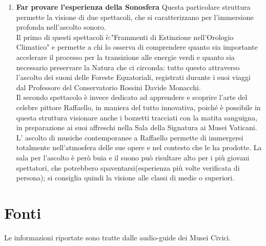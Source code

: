 \documentclass[hidelinks,12pt,a4paper]{article}
\begin{document}
\begin{flushleft}
\begin{enumerate}
\begin{adjustwidth}{-30mm}{0mm}
\begin{minipage}{\linewidth}
\begin{minipage}[t] {0.4\linewidth}
				\end{minipage}
			\end{minipage}
		\end{adjustwidth}
		
		\item \textbf{Far provare l'esperienza della Sonosfera}
		Questa particolare struttura permette la visione di due spettacoli, che si caratterizzano per l'immersione profonda nell'ascolto sonoro.\\
		Il primo di questi spettacoli è:"Frammenti di Estinzione nell'Orologio Climatico" e permette a chi lo osserva di comprendere quanto sia importante accelerare il processo per la transizione alle energie verdi e quanto sia necessario preservare la Natura che ci circonda: tutto questo attraverso l'ascolto dei suoni delle Foreste Equatoriali, registrati durante i suoi viaggi dal Professore del Conservatorio Rossini Davide Monacchi.\\
		Il secondo spettacolo è invece dedicato ad apprendere e scoprire l'arte del celebre pittore Raffaello, in maniera del tutto innovativa, poiché è possibile in questa struttura visionare anche i bozzetti tracciati con la matita sanguigna, in preparazione ai suoi affreschi nella Sala della Signatura ai Musei Vaticani.\\
		L' ascolto di musiche contemporanee a Raffaello permette di immergersi totalmente nell'atmosfera delle sue opere e nel contesto che le ha prodotte. La sala per l'ascolto è però buia e il suono può risultare alto per i più giovani spettatori, che potrebbero spaventarsi(esperienza più volte verificata di persona); si consiglia quindi la visione alle classi di medie o superiori.
	\end{enumerate}
	\newpage
	\listoffigures
	
	\newpage
	\section{Fonti}
	Le informazioni riportate sono tratte dalle audio-guide dei Musei Civici.
	
	\vspace*{\fill}
	\doclicenseThis
	\end{flushleft}
\end{document}
